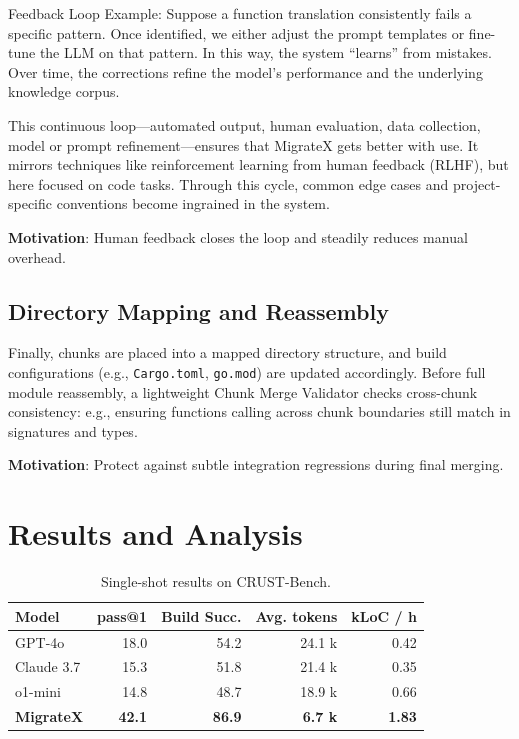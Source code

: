 \documentclass[twocolumn]{article}
\begin{document}
{Feedback Loop Example}: Suppose a function translation consistently fails a specific pattern. Once identified, we either adjust the prompt templates or fine-tune the LLM on that pattern. In this way, the system ``learns'' from mistakes. Over time, the corrections refine the model’s performance and the underlying knowledge corpus.


This continuous loop—automated output, human evaluation, data collection, model or prompt refinement—ensures that MigrateX gets better with use. It mirrors techniques like reinforcement learning from human feedback (RLHF), but here focused on code tasks. Through this cycle, common edge cases and project-specific conventions become ingrained in the system.


\textbf{Motivation}: Human feedback closes the loop and steadily reduces manual overhead.

\subsection{Directory Mapping and Reassembly}

Finally, chunks are placed into a mapped directory structure, and build configurations (e.g., \texttt{Cargo.toml}, \texttt{go.mod}) are updated accordingly. Before full module reassembly, a lightweight {Chunk Merge Validator} checks cross-chunk consistency: e.g., ensuring functions calling across chunk boundaries still match in signatures and types.

\textbf{Motivation}: Protect against subtle integration regressions during final merging.

    \section{Results and Analysis}
    \label{sec:results}
    
    \begin{table}[htbp]
        \centering
        \caption{Single-shot results on CRUST-Bench.}
        \label{tab:pass}
        \begin{tabular}{lrrrr}
          \toprule
          \textbf{Model} & pass@1 & Build Succ. & Avg. tokens & kLoC / h \\
          \midrule
          GPT-4o            & 18.0 & 54.2 & 24.1 k & 0.42 \\
          Claude 3.7        & 15.3 & 51.8 & 21.4 k & 0.35 \\
          o1-mini           & 14.8 & 48.7 & 18.9 k & 0.66 \\
          \textbf{MigrateX} & \textbf{42.1} & \textbf{86.9} & \textbf{6.7 k} & \textbf{1.83} \\
          \bottomrule
        \end{tabular}
      \end{table}
    
\end{document}
